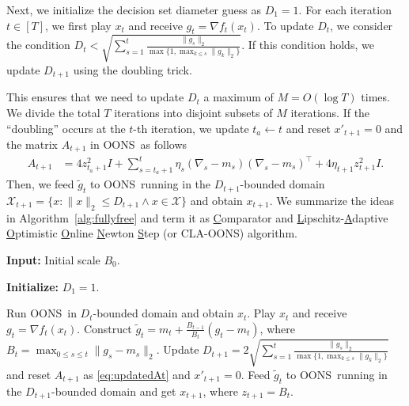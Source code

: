 \documentclass{article}
\theoremstyle{plain}
\theoremstyle{definition}
\theoremstyle{remark}
\newcommand{\cX}{\mathcal{X}}
\newcommand{\oons}{{\sc OONS}}
\newcommand{\claoons}{{\sc CLA-OONS}}
\renewcommand{\tilde}{\widetilde}
\begin{document}
Next, we initialize the decision set diameter guess as $D_1=1$. For each iteration $t\in[T]$, we first play $x_t$ and receive $g_t=\nabla f_t(x_t)$. To update $D_t$, we consider the condition  $
D_t < \sqrt{\sum_{s=1}^t\frac{\|g_s \|_2}{\max\{1,\max_{k \leq s} \| g_k \|_2 \}}}$. If this condition holds, we update $D_{t+1}$ using the doubling trick.

This ensures that %
we need to update $D_t$ a maximum of $M=O(\log T)$ times. %
We divide the total $T$ iterations into disjoint subsets of $M$ iterations. If the ``doubling'' occurs at the $t$-th iteration, we update $t_a\leftarrow t$ and reset $x'_{t+1}=0$ and the matrix $A_{t+1}$ in \oons\ as follows
\begin{align}
\label{eq:updatedAt}
A_{t+1} &= 4z_{t_a+1}^2 I \!+\! \sum_{s=t_a+1}^{t} \!\eta_s(\nabla_s - m_s)(\nabla_s - m_s)^\top+4\eta_{t+1}z_{t+1}^2 I.
\end{align}
Then, we feed $\tilde{g}_t$ to \oons\ running in the $D_{t+1}$-bounded domain $\cX_{t+1}=\{x:\|x\|_2\leq D_{t+1}\wedge x \in \cX\}$ and obtain $x_{t+1}$. %
We summarize the ideas in Algorithm~\ref{alg:fullyfree} and term it as \underline{C}omparator and \underline{L}ipschitz-\underline{A}daptive \underline{O}ptimistic \underline{O}nline \underline{N}ewton \underline{S}tep (or \claoons) algorithm.






\begin{algorithm}[t]
\caption{Comparator and Lipschitz-Adaptive (or \claoons) for the SEA model}
\label{alg:fullyfree}

    \textbf{Input:} Initial scale $B_0$.

    \textbf{Initialize:} $D_1=1$.
    
    \begin{algorithmic}[1]
        \STATE Run \oons\ in $D_t$-bounded domain and obtain $x_t$. Play $x_t$ and receive $g_t=\nabla f_t(x_t)$.
        \STATE Construct $\tilde{g}_t=m_t+\frac{B_{t-1}}{B_t}(g_t-m_t)$, where $B_t=\max_{0\leq s\leq t}\|g_s-m_s\|_2$.
            \STATE Update $D_{t+1} = 2\sqrt{\sum_{s=1}^t\frac{\|g_s \|_2}{\max\{1,\max_{k \leq s} \| g_k \|_2 \}}}$ and reset $A_{t+1}$ as \eqref{eq:updatedAt} and $x'_{t+1}=0$.
        \ENDIF
        \STATE Feed $\tilde{g}_t$ to \oons\ running in the $D_{t+1}$-bounded domain and get $x_{t+1}$, where  $z_{t+1} = B_t$. %
    \ENDFOR
\end{algorithmic}
\end{algorithm}
\end{document}
